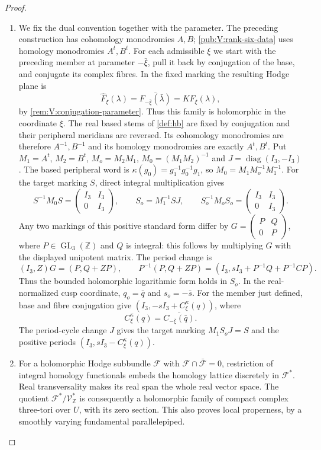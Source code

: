 \documentclass[11pt,a4paper]{article}
\numberwithin{equation}{section}
\theoremstyle{definition}
\begin{document}
\begin{proof}
\begin{enumerate}[label=\arabic*.]
\item We fix the dual convention together with the parameter.
The preceding construction has cohomology monodromies $A,B$;
\cref{pub:V:rank-six-data} uses homology monodromies $A^t,B^t$.
For each admissible $\xi$ we start with the preceding member
at parameter $-\bar\xi$, pull it back by conjugation of the
base, and conjugate its complex fibres. In the fixed marking
the resulting Hodge plane is
\[
 \widehat F_\xi(\lambda)
 =\overline{F_{-\bar\xi}(\bar\lambda)}
 =K F_\xi(\lambda),
\]
by \cref{rem:V:conjugation-parameter}. Thus this family is
holomorphic in the coordinate $\xi$. The real based stems
of \cref{def:hb} are fixed by conjugation and their peripheral
meridians are reversed. Its cohomology monodromies are therefore
$A^{-1},B^{-1}$ and its homology monodromies are exactly
$A^t,B^t$.
Put $M_1=A^t$, $M_2=B^t$, $M_o=M_2M_1$, $M_0=(M_1M_2)^{-1}$ and
$J=\operatorname{diag}(I_3,-I_3)$.  The based peripheral word is
$\kappa(g_0)=g_1^{-1}g_0^{-1}g_1$, so
$M_0=M_1M_o^{-1}M_1^{-1}$.  For the target marking $S$,
direct integral multiplication gives
\[
 S^{-1}M_0S=\begin{pmatrix}I_3&I_3\\0&I_3\end{pmatrix},\qquad
 S_o=M_1^{-1}SJ,\qquad
 S_o^{-1}M_oS_o=\begin{pmatrix}I_3&I_3\\0&I_3\end{pmatrix}.
\]
Any two markings of this positive standard form differ by
$G=\left(\begin{smallmatrix}P&Q\\0&P\end{smallmatrix}\right)$,
where $P\in\operatorname{GL}_3(\mathbb Z)$ and $Q$ is integral:
this follows by multiplying $G$ with the displayed unipotent
matrix.  The period change is
\[
 (I_3,Z)G=(P,Q+ZP),\qquad
 P^{-1}(P,Q+ZP)
  =(I_3,sI_3+P^{-1}Q+P^{-1}CP).
\]
Thus the bounded holomorphic logarithmic form holds in $S_o$.
In the real-normalized cusp coordinate,
$q_o=\bar q$ and $s_o=-\bar s$.
For the member just defined, base and fibre conjugation give
$(I_3,-sI_3+C^\kappa_\xi(q))$, where
\[
 C^\kappa_\xi(q)
   =\overline{C_{-\bar\xi}(\bar q)}.
\]
The period-cycle change $J$ gives the target marking
$M_1S_oJ=S$ and the positive periods
$(I_3,sI_3-C^\kappa_\xi(q))$.


\item For a holomorphic Hodge subbundle $\mathcal F$ with
$\mathcal F\cap\bar{\mathcal F}=0$, restriction of integral
homology functionals embeds the homology lattice discretely in
$\mathcal F^*$.  Real transversality makes its real span the
whole real vector space.  The quotient
$\mathcal F^*/\mathcal V_{\mathbb Z}^*$ is consequently a
holomorphic family of compact complex three-tori over $U$,
with its zero section.  This also proves local properness,
by a smoothly varying fundamental parallelepiped.


\end{enumerate}
\end{proof}
\end{document}

